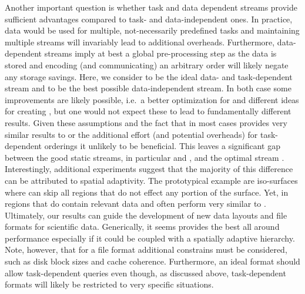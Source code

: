 Another important question is whether task and data dependent streams provide sufficient advantages
compared to task- and data-independent ones. In practice, data would be used for multiple,
not-necessarily predefined tasks and maintaining multiple streams will invariably lead to additional
overheads. Furthermore, data-dependent streams imply at best a global pre-processing step as the
data is stored and encoding (and communicating) an arbitrary order will likely negate any storage
savings. Here, we consider \sopt to be the ideal data- and task-dependent stream and \ssig to be the
best possible data-independent stream. In both case some improvements are likely possible, i.e.\ a
better optimization for \sopt and different ideas for creating \ssig, but one would not expect these
to lead to fundamentally different results. Given these assumptions and the fact that \ssig in most
cases provides very similar results to \sbit or \swav the additional effort (and potential
overheads) for task-dependent orderings it unlikely to be beneficial. This leaves a significant gap
between the good static streams, in particular \swav and \sbit, and the optimal stream \sopt.
Interestingly, additional experiments suggest that the majority of this difference can be attributed
to spatial adaptivity. The prototypical example are iso-surfaces where \sopt can skip all regions
that do not effect any portion of the surface. Yet, in regions that do contain relevant data \swav
and \sbit often perform very similar to \sopt. Ultimately, our results can guide the development of
new data layouts and file formats for scientific data. Generically, it seems \swav provides the best
all around performance especially if it could be coupled with a spatially adaptive hierarchy. Note,
however, that for a file format additional constrains must be considered, such as disk block sizes
and cache coherence. Furthermore, an ideal format should allow task-dependent queries even though,
as discussed above, task-dependent formats will likely be restricted to very specific situations. 

